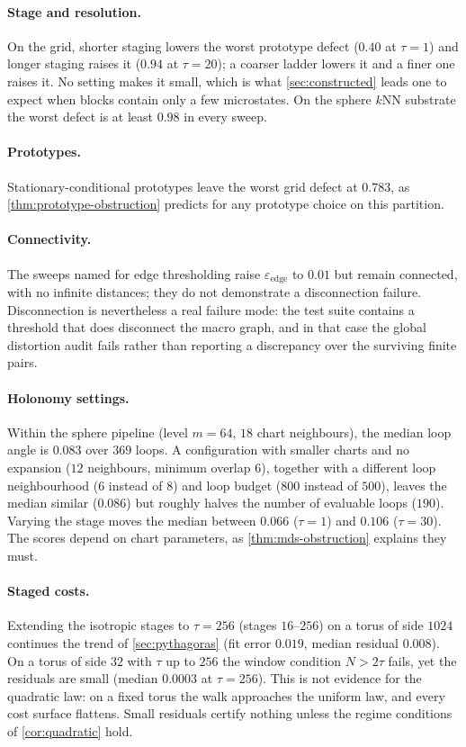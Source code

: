 \paragraph{Stage and resolution.}
On the grid, shorter staging lowers the worst prototype defect ($0.40$ at $\tau=1$) and longer staging raises it ($0.94$ at $\tau=20$); a coarser ladder lowers it and a finer one raises it.
No setting makes it small, which is what \cref{sec:constructed} leads one to expect when blocks contain only a few microstates.
On the sphere $k$NN substrate the worst defect is at least $0.98$ in every sweep.

\paragraph{Prototypes.}
Stationary-conditional prototypes leave the worst grid defect at $0.783$, as \cref{thm:prototype-obstruction} predicts for any prototype choice on this partition.

\paragraph{Connectivity.}
The sweeps named for edge thresholding raise $\varepsilon_{\mathrm{edge}}$ to $0.01$ but remain connected, with no infinite distances; they do not demonstrate a disconnection failure.
Disconnection is nevertheless a real failure mode: the test suite contains a threshold that does disconnect the macro graph, and in that case the global distortion audit fails rather than reporting a discrepancy over the surviving finite pairs.

\paragraph{Holonomy settings.}
Within the sphere pipeline (level $m=64$, $18$ chart neighbours), the median loop angle is $0.083$ over $369$ loops.
A configuration with smaller charts and no expansion ($12$ neighbours, minimum overlap $6$), together with a different loop neighbourhood ($6$ instead of $8$) and loop budget ($800$ instead of $500$), leaves the median similar ($0.086$) but roughly halves the number of evaluable loops ($190$).
Varying the stage moves the median between $0.066$ ($\tau=1$) and $0.106$ ($\tau=30$).
The scores depend on chart parameters, as \cref{thm:mds-obstruction} explains they must.

\paragraph{Staged costs.}
Extending the isotropic stages to $\tau=256$ (stages $16$--$256$) on a torus of side $1024$ continues the trend of \cref{sec:pythagoras} (fit error $0.019$, median residual $0.008$).
On a torus of side $32$ with $\tau$ up to $256$ the window condition $N>2\tau$ fails, yet the residuals are small (median $0.0003$ at $\tau=256$).
This is not evidence for the quadratic law: on a fixed torus the walk approaches the uniform law, and every cost surface flattens.
Small residuals certify nothing unless the regime conditions of \cref{cor:quadratic} hold.


